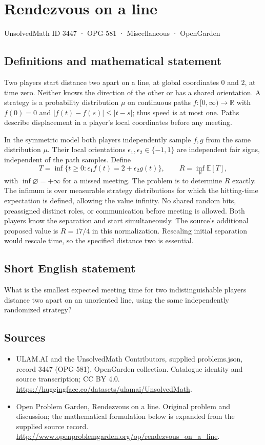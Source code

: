 \documentclass[11pt,a4paper]{article}
\begin{document}
\section*{Rendezvous on a line}\label{3447}
{\small UnsolvedMath ID 3447 · OPG-581 · Miscellaneous · OpenGarden}
\subsection{Definitions and mathematical statement}
Two players start distance two apart on a line, at global coordinates
$0$ and $2$, at time zero. Neither knows the direction of the other
or has a shared orientation. A strategy is a probability distribution
$\mu$ on continuous paths $f:[0,\infty)\to\mathbb R$ with $f(0)=0$
and $|f(t)-f(s)|\le|t-s|$; thus speed is at most one. Paths describe
displacement in a player's local coordinates before any meeting.

In the symmetric model both players independently sample $f,g$
from the same distribution $\mu$. Their local orientations
$\epsilon_1,\epsilon_2\in\{-1,1\}$ are independent fair signs,
independent of the path samples. Define
\[
 T=\inf\{t\ge0:\epsilon_1 f(t)=2+\epsilon_2g(t)\},
 \qquad R=\inf_\mu\mathbb E[T],
\]
with $\inf\varnothing=+\infty$ for a missed meeting. The problem is
to determine $R$ exactly. The infimum is over measurable strategy
distributions for which the hitting-time expectation is defined,
allowing the value infinity.
No shared random bits, preassigned distinct roles, or communication
before meeting is allowed. Both players know the separation and
start simultaneously. The source's additional proposed value is
$R=17/4$ in this normalization. Rescaling initial separation would
rescale time, so the specified distance two is essential.
\subsection{Short English statement}
What is the smallest expected meeting time for two indistinguishable players distance two apart on an unoriented line, using the same independently randomized strategy?
\subsection{Sources}
\begin{itemize}
\item[S1] ULAM.AI and the UnsolvedMath Contributors, supplied problems.json, record 3447 (OPG-581), OpenGarden collection. Catalogue identity and source transcription; CC BY 4.0.
\url{https://huggingface.co/datasets/ulamai/UnsolvedMath}.
\item[S2] Open Problem Garden, Rendezvous on a line. Original problem and discussion; the mathematical formulation below is expanded from the supplied source record.
\url{http://www.openproblemgarden.org/op/rendezvous_on_a_line}.
\end{itemize}
\end{document}
